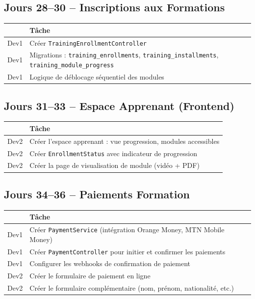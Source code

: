 \documentclass[12pt,a4paper]{report}
\begin{document}
\subsection*{Jours 28--30 -- Inscriptions aux Formations}

\begin{tabularx}{\textwidth}{l X}
    \toprule
    & \textbf{Tâche} \\
    \midrule
    Dev1 & Créer \texttt{TrainingEnrollmentController} \\
    Dev1 & Migrations : \texttt{training\_enrollments}, \texttt{training\_installments}, \texttt{training\_module\_progress} \\
    Dev1 & Logique de déblocage séquentiel des modules \\
    \bottomrule
\end{tabularx}

\subsection*{Jours 31--33 -- Espace Apprenant (Frontend)}

\begin{tabularx}{\textwidth}{l X}
    \toprule
    & \textbf{Tâche} \\
    \midrule
    Dev2 & Créer l'espace apprenant : vue progression, modules accessibles \\
    Dev2 & Créer \texttt{EnrollmentStatus} avec indicateur de progression \\
    Dev2 & Créer la page de visualisation de module (vidéo + PDF) \\
    \bottomrule
\end{tabularx}

\subsection*{Jours 34--36 -- Paiements Formation}

\begin{tabularx}{\textwidth}{l X}
    \toprule
    & \textbf{Tâche} \\
    \midrule
    Dev1 & Créer \texttt{PaymentService} (intégration Orange Money, MTN Mobile Money) \\
    Dev1 & Créer \texttt{PaymentController} pour initier et confirmer les paiements \\
    Dev1 & Configurer les webhooks de confirmation de paiement \\
    Dev2 & Créer le formulaire de paiement en ligne \\
    Dev2 & Créer le formulaire complémentaire (nom, prénom, nationalité, etc.) \\
    \bottomrule
\end{tabularx}
\end{document}
